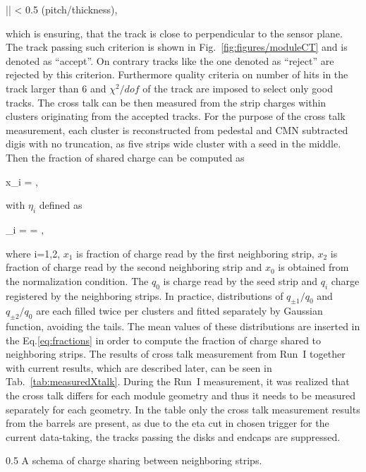 {
|\theta {}\phi| < 0.5 \times (pitch/thickness),
}

which is ensuring, that the track is close to perpendicular to the sensor plane. The track passing such criterion is shown in Fig.~\ref{fig:figures/moduleCT} and is denoted as ``accept''. On contrary tracks like the one denoted as ``reject'' are rejected by this criterion. Furthermore quality criteria on number of hits in the track larger than 6 and $\chi^{2}/dof$ of the track are imposed to select only good tracks. The cross talk can be then measured from the strip charges within clusters originating from the accepted tracks. For the purpose of the cross talk measurement, each cluster is reconstructed from pedestal and CMN subtracted digis with no truncation, as five strips wide cluster with a seed in the middle. Then the fraction of shared charge can be computed as


{
x_{i} =  ,
}

with $\eta_{i}$ defined as

{
\eta_{i} =  =  ,
}

where i=1,2, $x_{1}$ is fraction of charge read by the first neighboring strip,  $x_{2}$ is fraction of charge read by the second neighboring strip and $x_{0}$ is obtained from the normalization condition. The $q_{0}$ is charge read by the seed strip and $q_{i}$ charge registered by the neighboring strips. In practice, distributions of $q_{\pm 1}/q_{0}$ and $q_{\pm 2}/q_{0}$ are each filled twice per clusters and  fitted separately by Gaussian function, avoiding the tails. The mean values of these distributions are inserted in the Eq.\ref{eq:fractions} in order to compute the fraction of charge shared to neighboring strips. The results of cross talk measurement from Run~I together with current results, which are described later, can be seen in Tab.~\ref{tab:measuredXtalk}. During the Run~I measurement, it was realized that the cross talk differs for each module geometry and thus it needs to be measured separately for each geometry. In the table only the cross talk measurement results from the barrels are present, as due to the eta cut in chosen trigger for the current data-taking, the tracks passing the disks and endcaps are suppressed. 

                 {0.5}       %
                 { A schema of charge sharing between neighboring strips. }

